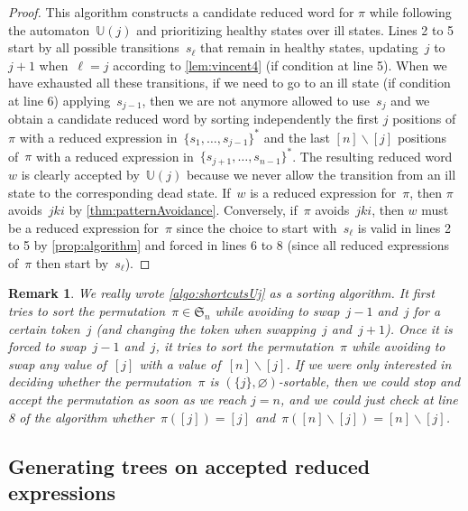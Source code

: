 \documentclass{amsart}
\newtheorem{remark}[theorem]{Remark}
\newcommand{\fS}{\mathfrak{S}} %
\newcommand{\ssm}{\smallsetminus} %
\newcommand{\automatonU}{\mathbb{U}} %
\begin{document}
\begin{proof}
This algorithm constructs a candidate reduced word for $\pi$ while following the automaton~$\automatonU(j)$ and prioritizing healthy states over ill states.
Lines 2 to 5 start by all possible transitions~$s_\ell$ that remain in healthy states, updating~$j$ to~$j+1$ when~$\ell = j$ according to \cref{lem:vincent4} (if condition at line 5).
When we have exhausted all these transitions, if we need to go to an ill state (if condition at line 6) applying~$s_{j-1}$, then we are not anymore allowed to use~$s_j$ and we obtain a candidate reduced word by sorting independently the first $j$ positions of~$\pi$ with a reduced expression in~$\{s_1, \dots, s_{j-1}\}^*$ and the last $[n] \ssm [j]$ positions of~$\pi$ with a reduced expression in~$\{s_{j+1}, \dots, s_{n-1}\}^*$.
The resulting reduced word~$w$ is clearly accepted by~$\automatonU(j)$ because we never allow the transition from an ill state to the corresponding dead state.
If~$w$ is a reduced expression for~$\pi$, then $\pi$ avoids~$jki$ by \cref{thm:patternAvoidance}.
Conversely, if~$\pi$ avoids~$jki$, then $w$ must be a reduced expression for~$\pi$ since the choice to start with~$s_\ell$ is valid in lines 2 to 5 by \cref{prop:algorithm} and forced in lines 6 to 8 (since all reduced expressions of~$\pi$ then start by~$s_\ell$).
\end{proof}

\begin{remark}
We really wrote \cref{algo:shortcutsUj} as a sorting algorithm.
It first tries to sort the permutation~$\pi \in \fS_n$ while avoiding to swap~$j-1$ and~$j$ for a certain token~$j$ (and changing the token when swapping~$j$ and~$j+1$).
Once it is forced to swap~$j-1$ and~$j$, it tries to sort the permutation~$\pi$ while avoiding to swap any value of~$[j]$ with a value of~$[n] \ssm [j]$.
If we were only interested in deciding whether the permutation~$\pi$ is $(\{j\}, \varnothing)$-sortable, then we could stop and accept the permutation as soon as we reach $j = n$, and we could just check at line 8 of the algorithm whether~$\pi([j]) = [j]$ and~$\pi([n] \ssm [j]) = [n] \ssm [j]$.
\end{remark}

\subsection{Generating trees on accepted reduced expressions}\label{subsec:trees}
\end{document}
